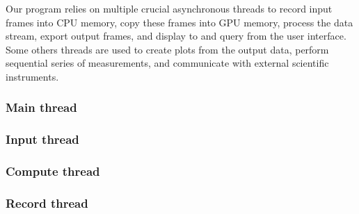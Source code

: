 Our program relies on multiple crucial asynchronous threads to record input frames into CPU memory, copy these frames into GPU memory, process the data stream, export output frames, and display to and query from the user interface. Some others threads are used to create plots from the output data, perform sequential series of measurements, and communicate with external scientific instruments.

\subsubsection*{Main thread}


\subsubsection*{Input thread}


\subsubsection*{Compute thread}


\subsubsection*{Record thread}
